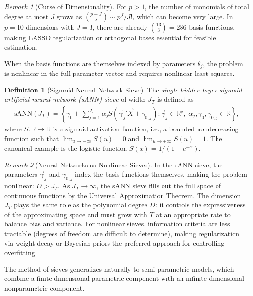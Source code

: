 \documentclass[11pt]{article}
\theoremstyle{definition}
\newtheorem{definition}{Definition}[section]
\theoremstyle{plain}
\theoremstyle{remark}
\newtheorem{remark}{Remark}[section]
\begin{document}
\begin{remark}[Curse of Dimensionality]
    For $p > 1$, the number of monomials of total degree at most $J$ grows as $\binom{p+J}{J} \sim p^J / J!$, which can become very large. In $p = 10$ dimensions with $J = 3$, there are already $\binom{13}{3} = 286$ basis functions, making LASSO regularization or orthogonal bases essential for feasible estimation.
\end{remark}

When the basis functions are themselves indexed by parameters $\theta_j$, the problem is nonlinear in the full parameter vector and requires nonlinear least squares.

\begin{definition}[Sigmoid Neural Network Sieve]
    The \textit{single hidden layer sigmoid artificial neural network (sANN) sieve} of width $J_T$ is defined as
    \begin{align}
        \mathrm{sANN}(J_T) = \left\{ \gamma_0 + \sum_{j=1}^{J_T} \alpha_j S(\vec{\gamma}_j' \vec{X} + \gamma_{0,j}) : \vec{\gamma}_j \in \mathbb{R}^p,\; \alpha_j, \gamma_0, \gamma_{0,j} \in \mathbb{R} \right\},
    \end{align}
    where $S: \mathbb{R} \to \mathbb{R}$ is a sigmoid activation function, i.e., a bounded nondecreasing function such that $\lim_{u \to -\infty} S(u) = 0$ and $\lim_{u \to +\infty} S(u) = 1$. The canonical example is the logistic function $S(x) = 1/(1+e^{-x})$.
\end{definition}

\begin{remark}[Neural Networks as Nonlinear Sieves]
    In the sANN sieve, the parameters $\vec{\gamma}_j$ and $\gamma_{0,j}$ index the basis functions themselves, making the problem nonlinear: $D > J_T$. As $J_T \to \infty$, the sANN sieve fills out the full space of continuous functions by the Universal Approximation Theorem. The dimension $J_T$ plays the same role as the polynomial degree $D$: it controls the expressiveness of the approximating space and must grow with $T$ at an appropriate rate to balance bias and variance. For nonlinear sieves, information criteria are less tractable (degrees of freedom are difficult to determine), making regularization via weight decay or Bayesian priors the preferred approach for controlling overfitting.
\end{remark}

The method of sieves generalizes naturally to semi-parametric models, which combine a finite-dimensional parametric component with an infinite-dimensional nonparametric component.
\end{document}
